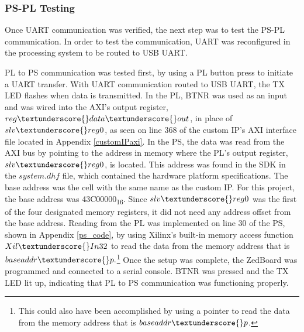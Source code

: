 \subsubsection{PS-PL Testing}
Once UART communication was verified, the next step was to test the PS-PL communication. In order to test the communication, UART was reconfigured in the processing system to be routed to USB UART.
\par
PL to PS communication was tested first, by using a PL button press to initiate a UART transfer. With UART communication routed to USB UART, the TX LED flashes when data is transmitted. In the PL, BTNR was used as an input and was wired into the AXI's output register, $reg\textunderscore{}data\textunderscore{}out$, in place of $slv\textunderscore{}reg0$, as seen on line 368 of the custom IP's AXI interface file located in Appendix \ref{customIPaxi}. In the PS, the data was read from the AXI bus by pointing to the address in memory where the PL's output register, $slv\textunderscore{}reg0$, is located. This address was found in the SDK in the $system.dhf$ file, which contained the hardware platform specifications. The base address was the cell with the same name as the custom IP. For this project, the base address was 43C00000\textsubscript{16}. Since $slv\textunderscore{}reg0$ was the first of the four designated memory registers, it did not need any address offset from the base address. Reading from the PL was implemented on line 30 of the PS, shown in Appendix \ref{ps_code}, by using Xilinx's built-in memory access function $Xil\textunderscore{}In32$ to read the data from the memory address that is $baseaddr\textunderscore{}p.$\footnote{ This could also have been accomplished by using a pointer to read the data from the memory address that is $baseaddr\textunderscore{}p$.} Once the setup was complete, the ZedBoard was programmed and connected to a serial console. BTNR was pressed and the TX LED lit up, indicating that PL to PS communication was functioning properly.
\par
